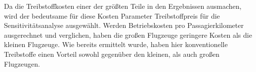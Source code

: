 Da die Treibstoffkosten einer der größten Teile in den Ergebnissen ausmachen, 
wird der bedeutsame für diese Kosten Parameter Treibstoffpreis für die Sensitivitätsanalyse ausgewählt.
%
Werden Betriebskosten pro Passagierkilometer ausgerechnet und verglichen, 
haben die großen Flugzeuge geringere Kosten als die kleinen Flugzeuge.
Wie bereits ermittelt wurde, haben hier konventionelle Treibstoffe %
einen Vorteil sowohl gegenüber den kleinen, als auch großen Flugzeugen.
